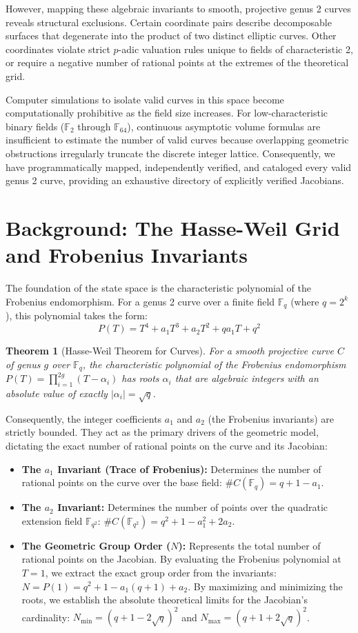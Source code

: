 \documentclass[letterpaper, 11pt]{article}
\newtheorem{theorem}{Theorem}[section]
\begin{document}
	However, mapping these algebraic invariants to smooth, projective genus 2 curves reveals structural exclusions. Certain coordinate pairs describe decomposable surfaces that degenerate into the product of two distinct elliptic curves. Other coordinates violate strict $p$-adic valuation rules unique to fields of characteristic 2, or require a negative number of rational points at the extremes of the theoretical grid.
	
	Computer simulations to isolate valid curves in this space become computationally prohibitive as the field size increases. For low-characteristic binary fields ($\mathbb{F}_2$ through $\mathbb{F}_{64}$), continuous asymptotic volume formulas are insufficient to estimate the number of valid curves because overlapping geometric obstructions irregularly truncate the discrete integer lattice. Consequently, we have programmatically mapped, independently verified, and cataloged every valid genus 2 curve, providing an exhaustive directory of explicitly verified Jacobians.
	
	\section{Background: The Hasse-Weil Grid and Frobenius Invariants}
	The foundation of the state space is the characteristic polynomial of the Frobenius endomorphism. For a genus 2 curve over a finite field $\mathbb{F}_q$ (where $q = 2^k$), this polynomial takes the form:
	\[ P(T) = T^4 + a_1 T^3 + a_2 T^2 + q a_1 T + q^2 \]
	
	\begin{theorem}[Hasse-Weil Theorem for Curves]
		For a smooth projective curve $C$ of genus $g$ over $\mathbb{F}_q$, the characteristic polynomial of the Frobenius endomorphism $P(T) = \prod_{i=1}^{2g} (T - \alpha_i)$ has roots $\alpha_i$ that are algebraic integers with an absolute value of exactly $|\alpha_i| = \sqrt{q}$.
	\end{theorem}
	
	Consequently, the integer coefficients $a_1$ and $a_2$ (the Frobenius invariants) are strictly bounded. They act as the primary drivers of the geometric model, dictating the exact number of rational points on the curve and its Jacobian:
	\begin{itemize}
		\item \textbf{The $a_1$ Invariant (Trace of Frobenius):} Determines the number of rational points on the curve over the base field: $\#C(\mathbb{F}_q) = q + 1 - a_1$.
		\item \textbf{The $a_2$ Invariant:} Determines the number of points over the quadratic extension field $\mathbb{F}_{q^2}$: $\#C(\mathbb{F}_{q^2}) = q^2 + 1 - a_1^2 + 2a_2$.
		\item \textbf{The Geometric Group Order ($N$):} Represents the total number of rational points on the Jacobian. By evaluating the Frobenius polynomial at $T=1$, we extract the exact group order from the invariants: $N = P(1) = q^2 + 1 - a_1(q + 1) + a_2$. By maximizing and minimizing the roots, we establish the absolute theoretical limits for the Jacobian's cardinality: $N_{\text{min}} = (q + 1 - 2\sqrt{q})^2$ and $N_{\text{max}} = (q + 1 + 2\sqrt{q})^2$.
	\end{itemize}
	
\end{document}
